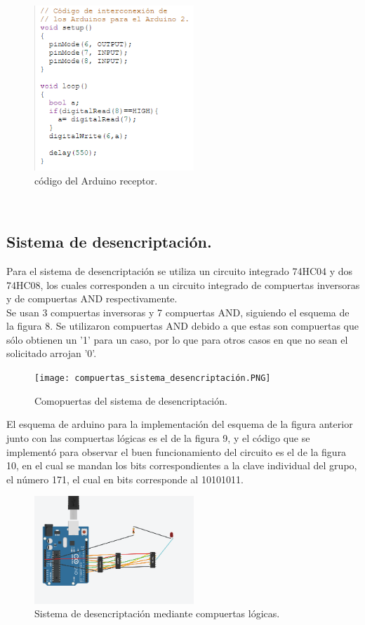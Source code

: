 \documentclass{article}
\begin{document}
\begin{figure}[h]
\includegraphics[width=6cm]{codigo_arduino2.PNG}
\centering
\caption{código del Arduino receptor.}
\label{fig:codigo_arduino2.PNG}
\end{figure}
\cite{punto2}\\


\subsection{Sistema de desencriptación.}

Para el sistema de desencriptación se utiliza un circuito integrado 74HC04 y dos 74HC08, los cuales corresponden a un circuito integrado de compuertas inversoras y de compuertas AND respectivamente.\\

Se usan 3 compuertas inversoras y 7 compuertas AND, siguiendo el esquema de la figura 8. Se utilizaron compuertas AND debido a que estas son compuertas que sólo obtienen un '1' para un caso, por lo que para otros casos en que no sean el solicitado arrojan '0'.


\begin{figure}[h]
\texttt{[image: compuertas\_sistema\_desencriptación.PNG]}
\centering
\caption{Comopuertas del sistema de desencriptación.}
\label{fig:compuertas_sistema_desencriptación.PNG}
\end{figure}

El esquema de arduino para la implementación del esquema de la figura anterior junto con las compuertas lógicas es el de la figura 9, y el código que se implementó para observar el buen funcionamiento del circuito es el de la figura 10, en el cual se mandan los bits correspondientes a la clave individual del grupo, el número 171, el cual en bits corresponde al 10101011.


\begin{figure}[h]
\includegraphics[width=6cm]{sistema_desencriptacion.PNG}
\centering
\caption{Sistema de desencriptación mediante compuertas lógicas.}
\label{fig:sistema_desencriptacion.PNG}
\end{figure}
\cite{punto3}\\
\end{document}
